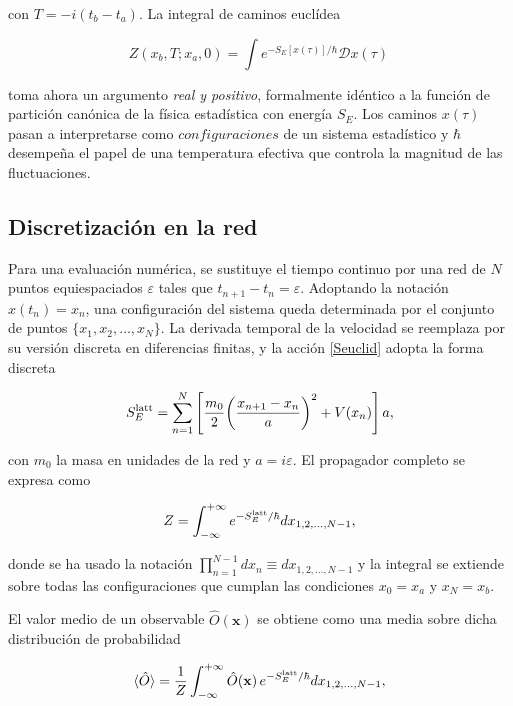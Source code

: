 \documentclass[11pt,a4paper,twoside,pdf]{article}
\numberwithin{equation}{section}
\begin{document}
con $T = -i(t_b - t_a)$. La integral de caminos euclídea

\begin{equation}
    Z(x_b, T; x_a, 0) = \int e^{-S_E[x(\tau)]/\hbar} \mathcal{D} x(\tau) \,
    \label{Zeuclid}
\end{equation}

toma ahora un argumento \textit{real y positivo}, formalmente idéntico a la función de partición canónica de la física estadística con energía $S_E$. Los caminos $x(\tau)$ pasan a interpretarse como $configuraciones$ de un sistema estadístico y $\hbar$ desempeña el papel de una temperatura efectiva que controla la magnitud de las fluctuaciones.



\subsection{Discretización en la red}
\label{red}


Para una evaluación numérica, se sustituye el tiempo continuo por una red de $N$ puntos equiespaciados $\varepsilon$ tales que $t_{n+1} - t_n = \varepsilon$. Adoptando la notación $x(t_n) = x_n$, una configuración del sistema queda determinada por el conjunto de puntos $\{x_1, x_2, \ldots, x_N\}$. La derivada temporal de la velocidad se reemplaza por su versión discreta en diferencias finitas, y la acción \ref{Seuclid} adopta la forma discreta

\begin{equation}
    S_E^{\rm latt} = \sum_{n=1}^{N} \left[ \frac{m_0}{2} \!\left( \frac{x_{n+1} - x_n}{a} \right)^2 + V(x_n) \right] a,
    \label{Slatt}
\end{equation}

con $m_0$ la masa en unidades de la red y $a=i\varepsilon$. El propagador completo se expresa como

\begin{equation}
    Z = \int_{-\infty}^{+\infty} e^{-S_E^{\rm latt}/\hbar} dx_{ {1, 2, \ldots, N-1} },
\end{equation}

donde se ha usado la notación $\prod_{n=1}^{N-1} dx_n \equiv dx_{1, 2, \ldots, N-1}$ y la integral se extiende sobre todas las configuraciones que cumplan  las condiciones $x_0 = x_{a}$ y $x_N = x_b$. 

El valor medio de un observable $\hat{O}(\mathbf{x})$ se obtiene como una media sobre dicha distribución de probabilidad

\begin{equation}
    \braket{\hat{O}} = \frac{1}{Z} \int_{-\infty}^{+\infty} \hat{O}(\mathbf{x})\, e^{-S_E^{\rm latt}/\hbar} dx_{1, 2, \ldots, N-1},
    \label{esperanza}
\end{equation}
\end{document}
